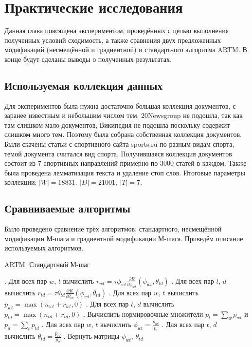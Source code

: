 \documentclass[12pt]{article}
\newenvironment{rusalgorithm}[1][htb]
  {\renewcommand{\algorithmcfname}{Алгоритм}
   \begin{algorithm}[#1]
  }{\end{algorithm}}
\begin{document}
	\section{Практические исследования}
Данная глава повсящена экспериментом, проведённых с целью выполнения полученных условий сходимость, а также сравнения двух предложенных модификаций (несмещённой и градиентной) и стандартного алгоритма ARTM. В конце будут сделаны выводы о полученных результатах.
\subsection{Используемая коллекция данных}
Для экспериментов была нужна достаточно большая коллекция документов, с заранее известным  и небольшим числом тем. 20Newsgroup не подошла, так как там слишком мало документов, Википедия не подошла поскольку содержит слишком много тем. Поэтому была собрана собственная коллекция документов. Были скачены статьи с спортивного сайта sports.ru по разным видам спорта, темой документа считался вид спорта. Получившаяся коллекция документов состоит из 7 спортивных направлений примерно по 3000 статей в каждом. Также была проведена лемматизация текста и удаление стоп слов. Итоговые параметры коллекции: $|W| = 18831,~|D| = 21001,~|T| = 7$.
	\subsection{Сравниваемые алгоритмы}
Было проведено сравнение трёх алгоритмов: стандартного, несмещённой модификации М-шага и градиентной модификации М-шага. Приведём описание используемых алгоритмов.
\begin{rusalgorithm}[H]
\caption{ARTM. Стандартный М-шаг}\label{malgo1}
\begin{algorithmic}[]
. Для всех пар $w$, $t$ вычислить $r_{wt} = \tau \phi_{wt} \frac{\partial{R}}{\partial{\phi_{wt}}}(\phi_{wt}, \theta_{td})$
. Для всех пар $t$, $d$ вычислить $r_{td} =\tau  \theta_{td} \frac{\partial{R}}{\partial{\theta_{td}}}(\phi_{wt}, \theta_{td})$
. Для всех пар $w$, $t$ вычислить $p_{wt} = \max(n_{wt} + r_{wt}, 0)$
. Для всех пар $t$, $d$ вычислить $p_{td} = \max(n_{td} + r_{td}, 0)$
. Вычислить нормировочные множители $p_t = \sum_w p_{wt}$ и $p_d = \sum_t p_{td}$
. Для всех пар $w$, $t$ вычислить $\phi_{wt} = \frac{p_{wt}}{p_t}$
. Для всех пар $t$, $d$ вычислить $\theta_{td} = \frac{p_{td}}{p_d}$
. Вернуть матрицы $\phi_{wt}$, $\theta_{td}$
\EndProcedure
\end{algorithmic}
\end{rusalgorithm}
\end{document}
